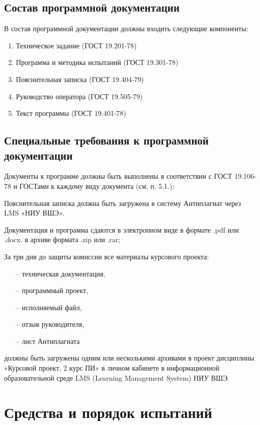 \documentclass{../../includes/TechDoc}
\begin{document}
    \subsection{Состав программной документации}

    В состав программной документации должны входить следующие компоненты:
    \begin{enumerate}
        \item Техническое задание (ГОСТ 19.201-78)
        \item Программа и методика испытаний (ГОСТ 19.301-78)
        \item Пояснительная записка (ГОСТ 19.404-79)
        \item Руководство оператора (ГОСТ 19.505-79)
        \item Текст программы (ГОСТ 19.401-78)
    \end{enumerate}

    \subsection{Специальные требования к программной документации}

    Документы к программе должны быть выполнены в соответствии с ГОСТ 19.106-78 и ГОСТами к каждому виду документа (см. п. 5.1.);

    Пояснительная записка должна быть загружена в систему Антиплагиат через LMS «НИУ ВШЭ».

    Документация и программа сдаются в электронном виде в формате .pdf или .docx. в архиве формата .zip или .rar;

    За три дня до защиты комиссии все материалы курсового проекта:
    \begin{itemize}
        \item[--] техническая документация,
        \item[--] программный проект,
        \item[--] исполняемый файл,
        \item[--] отзыв руководителя,
        \item[--] лист Антиплагиата
    \end{itemize}
    должны быть загружены одним или несколькими архивами в проект дисциплины «Курсовой проект, 2 курс ПИ» в личном кабинете в информационной образовательной среде LMS (Learning Management System) НИУ ВШЭ.

    \section{Средства и порядок испытаний}
\end{document}
